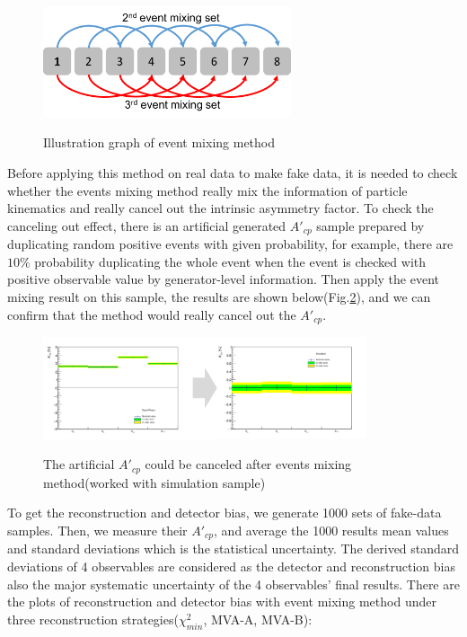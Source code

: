 		\begin{figure}[H]
		\centering{}
	    	\includegraphics[width=0.65\textwidth]{Figures/Asym/event_mixing.pdf}\\
		\caption{Illustration graph of event mixing method}
		\label{AsymBias:fig:event_mixing}
		\end{figure}
		\FloatBarrier

		Before applying this method on real data to make fake data, it is needed to check whether the events mixing method really mix the information of particle kinematics and really cancel out the intrinsic asymmetry factor. To check the canceling out effect, there is an artificial generated $A'_{cp}$ sample prepared by duplicating random positive events with given probability, for example, there are $10\%$ probability duplicating the whole event when the event is checked with positive observable value by generator-level information. Then apply the event mixing result on this sample, the results are shown below(Fig.\ref{AsymBias:fig:washout_artificial}), and we can confirm that the method would really cancel out the $A'_{cp}$.

		\begin{figure}[H]
		\centering{}
	    	\includegraphics[width=0.85\textwidth]{Figures/Asym/artificial/a05_artificial_to_mix_fixed.pdf}\\
		\caption{The artificial $A'_{cp}$ could be canceled after events mixing method(worked with simulation sample)}
		\label{AsymBias:fig:washout_artificial}
		\end{figure}
		\FloatBarrier

		To get the reconstruction and detector bias, we generate 1000 sets of fake-data samples. Then, we measure their $A'_{cp}$, and average the 1000 results mean values and standard deviations which is the statistical uncertainty. The derived standard deviations of 4 observables are considered as the detector and reconstruction bias also the major systematic uncertainty of the 4 observables' final results. There are the plots of reconstruction and detector bias with event mixing method under three reconstruction strategies($\chi^2_{min}$, MVA-A, MVA-B):

